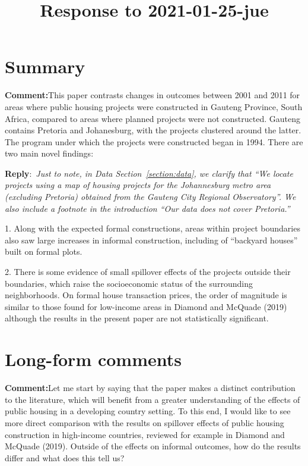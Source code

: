 \documentclass{article}
\title{Response to 2021-01-25-jue}
\author{}
\newcommand{\reply}{\medskip \noindent \textbf{Reply}:\ \textit }
\newcommand{\sr}{\begin{minipage}{\dimexpr\textwidth-3cm}}
\newcommand{\er}{\end{minipage}}
\newcommand{\cc}{\medskip \noindent \textbf{Comment:}\hspace{2em}}
\begin{document}
\maketitle

\noindent

\section{Summary}

\cc This paper contrasts changes in outcomes between 2001 and 2011 for areas where public housing projects were constructed in Gauteng Province, South Africa, compared to areas where planned projects were not constructed. Gauteng contains Pretoria and Johanesburg, with the projects clustered around the latter. The program under which the projects were constructed began in 1994. There are two main novel findings:

\sr
\reply{Just to note, in Data Section~\ref{section:data}, we clarify that ``We locate projects using a map of housing projects for the Johannesburg metro area (excluding Pretoria) obtained from the Gauteng City Regional Observatory''.  We also include a footnote in the introduction ``Our data does not cover Pretoria.'' }\\
\er

1. Along with the expected formal constructions, areas within project boundaries also saw large increases in informal construction, including of ``backyard houses'' built on formal plots.

2. There is some evidence of small spillover effects of the projects outside their boundaries, which raise the socioeconomic status of the surrounding neighborhoods. On formal house transaction prices, the order of magnitude is similar to those found for low-income areas in Diamond and McQuade (2019) although the results in the present paper are not statistically significant.

\section{Long-form comments}

\cc Let me start by saying that the paper makes a distinct contribution to the literature, which will benefit from a greater understanding of the effects of public housing in a developing country setting. To this end, I would like to see more direct comparison with the results on spillover effects of public housing construction in high-income countries, reviewed for example in Diamond and McQuade (2019). Outside of the effects on informal outcomes, how do the results differ and what does this tell us? 
\end{document}
